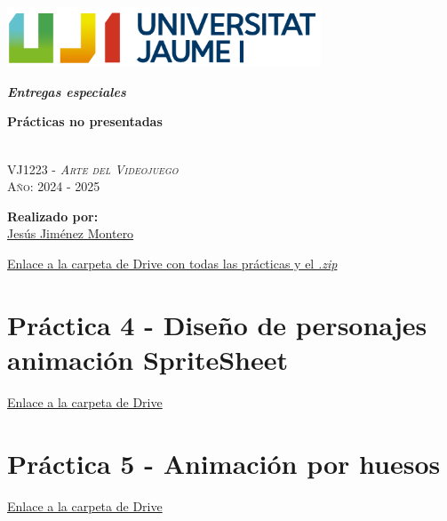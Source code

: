 \documentclass[12pt]{article}
\begin{document}
\pagecolor{pageColor}
\color{textColor}
\begin{titlepage}
    \vspace*{\fill}

    \centering
    \parbox{0.8\textwidth}{    %
        \includegraphics[width=0.7\textwidth]{imgs/marca-uji-color-fons-transparent.png}\par\vspace{1cm}

        {\Huge \bfseries \textit{Entregas especiales} \par}
        {\Large \bfseries Prácticas no presentadas \par}

        \textsc{\large }
        \vspace{0.5cm} \\
        \textsc{\Large VJ1223 - \textit{Arte del Videojuego}}
        \vspace{0.5cm} \\
        \textsc{\large Año: 2024 - 2025}
        \vfill

        \textbf{Realizado por:}         \\
        \href{https://www.richardotomislav.com/}{Jesús Jiménez Montero}      \\
    }
    \vspace*{\fill}
\end{titlepage}


\href{https://drive.google.com/open?id=10E1gfy_to1G-kv6yZ0nSZgwzYLCNiY-p&usp=drive_fs}{Enlace a la carpeta de Drive con todas las prácticas y el \textit{.zip}}
\section{Práctica 4 - Diseño de personajes animación SpriteSheet}
    \href{https://drive.google.com/open?id=10MmPTifcON0xG-mMmJiE0lPxJajcDE9M&usp=drive_fs}{Enlace a la carpeta de Drive}
\section{Práctica 5 - Animación por huesos}
    \href{https://drive.google.com/open?id=10GVJIcBJ4zyFtoNSeAsg95vutifNkphX&usp=drive_fs}{Enlace a la carpeta de Drive}
\end{document}
